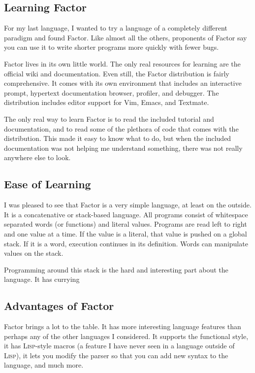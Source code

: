 \documentclass{article}
\begin{document}
\subsection{Learning Factor}

For my last language, I wanted to try a language of a completely different
paradigm and found Factor.  Like almost all the others, proponents of Factor say
you can use it to write shorter programs more quickly with fewer bugs.

Factor lives in its own little world.  The only real resources for learning are
the official wiki and documentation.  Even still, the Factor distribution is
fairly comprehensive.  It comes with its own environment that includes an
interactive prompt, hypertext documentation browser, profiler, and debugger.
The distribution includes editor support for Vim, Emacs, and Textmate.  

The only real way to learn Factor is to read the included tutorial and
documentation, and to read some of the plethora of code that comes with the
distribution.  This made it easy to know what to do, but when the included
documentation was not helping me understand something, there was not really
anywhere else to look.

\subsection{Ease of Learning}

I was pleased to see that Factor is a very simple language, at least on the
outside.  It is a concatenative or stack-based language.  All programs consist
of whitespace separated words (or functions) and literal values.  Programs are
read left to right and one value at a time.  If the value is a literal, that
value is pushed on a global stack.  If it is a word, execution continues in its
definition.  Words can manipulate values on the stack.

Programming around this stack is the hard and interesting part about the
language.  It has currying 

\subsection{Advantages of Factor}

Factor brings a lot to the table.  It has more interesting language features
than perhaps any of the other languages I considered.  It supports the
functional style, it has \textsc{Lisp}-style macros (a feature I have never seen
in a language outside of \textsc{Lisp}), it lets you modify the parser so that
you can add new syntax to the language, and much more.
\end{document}
